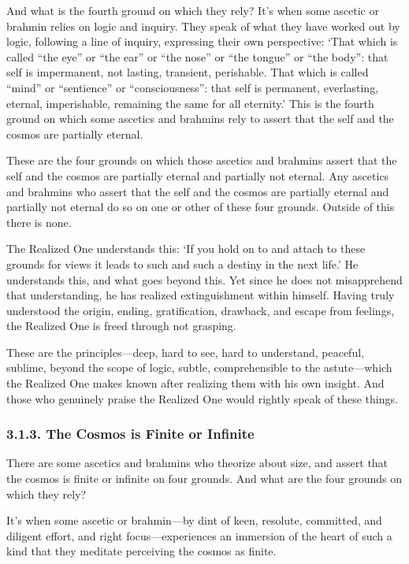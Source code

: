 \documentclass[12pt,openany]{book}%
\begin{document}
And what is the fourth ground on which they rely? It’s when some ascetic or brahmin relies on logic and inquiry. They speak of what they have worked out by logic, following a line of inquiry, expressing their own perspective: ‘That which is called “the eye” or “the ear” or “the nose” or “the tongue” or “the body”: that self is impermanent, not lasting, transient, perishable. That which is called “mind” or “sentience” or “consciousness”: that self is permanent, everlasting, eternal, imperishable, remaining the same for all eternity.’ This is the fourth ground on which some ascetics and brahmins rely to assert that the self and the cosmos are partially eternal. 

These are the four grounds on which those ascetics and brahmins assert that the self and the cosmos are partially eternal and partially not eternal. Any ascetics and brahmins who assert that the self and the cosmos are partially eternal and partially not eternal do so on one or other of these four grounds. Outside of this there is none. 

The Realized One understands this: ‘If you hold on to and attach to these grounds for views it leads to such and such a destiny in the next life.’ He understands this, and what goes beyond this. Yet since he does not misapprehend that understanding, he has realized extinguishment within himself. Having truly understood the origin, ending, gratification, drawback, and escape from feelings, the Realized One is freed through not grasping. 

These are the principles—deep, hard to see, hard to understand, peaceful, sublime, beyond the scope of logic, subtle, comprehensible to the astute—which the Realized One makes known after realizing them with his own insight. And those who genuinely praise the Realized One would rightly speak of these things. 

\subsubsection*{3.1.3. The Cosmos is Finite or Infinite }

There are some ascetics and brahmins who theorize about size, and assert that the cosmos is finite or infinite on four grounds. And what are the four grounds on which they rely? 

It’s when some ascetic or brahmin—by dint of keen, resolute, committed, and diligent effort, and right focus—experiences an immersion of the heart of such a kind that they meditate perceiving the cosmos as finite. 
\end{document}
